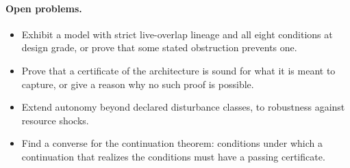\paragraph{Open problems.}
\begin{itemize}
\item Exhibit a model with strict live-overlap lineage and all eight conditions
at design grade, or prove that some stated obstruction prevents one.
\item Prove that a certificate of the architecture is sound for what it is meant
to capture, or give a reason why no such proof is possible.
\item Extend autonomy beyond declared disturbance classes, to robustness
against resource shocks.
\item Find a converse for the continuation theorem: conditions under which a
continuation that realizes the conditions must have a passing certificate.
\end{itemize}
